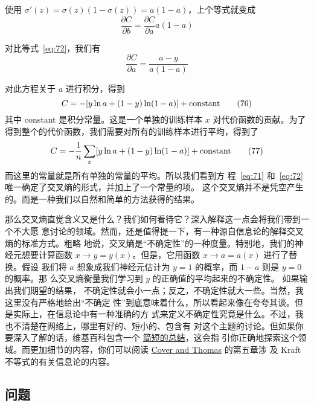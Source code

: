 使用 $\sigma'(z) = \sigma(z)(1-\sigma(z)) = a(1-a)$，上个等式就变成
\begin{equation}
  \frac{\partial C}{\partial b} = \frac{\partial C}{\partial a}
  a(1-a)
  \label{eq:74}\tag{74}
\end{equation}

对比等式~\eqref{eq:72}，我们有
\begin{equation}
  \frac{\partial C}{\partial a} = \frac{a-y}{a(1-a)}
  \label{eq:75}\tag{75}
\end{equation}

对此方程关于 $a$ 进行积分，得到
\begin{equation}
  C = -[y \ln a + (1-y) \ln (1-a)]+ {\rm constant}
  \label{eq:76}\tag{76}
\end{equation}
其中 {\rm constant} 是积分常量。这是一个单独的训练样本 $x$ 对代价函数的贡献。为了
得到整个的代价函数，我们需要对所有的训练样本进行平均，得到了
\begin{equation}
  C = -\frac{1}{n} \sum_x [y \ln a +(1-y) \ln(1-a)] + {\rm constant}
  \label{eq:77}\tag{77}
\end{equation}
而这里的常量就是所有单独的常量的平均。所以我们看到方
程~\eqref{eq:71} 和~\eqref{eq:72} 唯一确定了交叉熵的形式，并加上了一个常量的项。
这个交叉熵并不是凭空产生的。而是一种我们以自然和简单的方法获得的结果。

那么交叉熵直觉含义又是什么？我们如何看待它？深入解释这一点会将我们带到一个不大愿
意讨论的领域。然而，还是值得提一下，有一种源自信息论的解释交叉熵的标准方式。粗略
地说，交叉熵是“不确定性”的一种度量。特别地，我们的神经元想要计算函数 $x
\rightarrow y = y(x)$。但是，它用函数 $x \rightarrow a = a(x)$ 进行了替换。假设
我们将 $a$ 想象成我们神经元估计为 $y = 1$ 的概率，而 $1-a$ 则是 $y=0$ 的概率。那
么交叉熵衡量我们学习到 $y$ 的正确值的平均起来的不确定性。 如果输出我们期望的结果，
不确定性就会小一点；反之，不确定性就大一些。当然，我这里没有严格地给出“不确定
性”到底意味着什么，所以看起来像在夸夸其谈。但是实际上，在信息论中有一种准确的方
式来定义不确定性究竟是什么。不过，我也不清楚在网络上，哪里有好的、短小的、包含有
对这个主题的讨论。但如果你要深入了解的话，维基百科包含一个%
\href{http://en.wikipedia.org/wiki/Cross_entropy#Motivation}{简短的总结}，这会指
引你正确地探索这个领域。而更加细节的内容，你们可以阅读
\href{http://books.google.ca/books?id=VWq5GG6ycxMC}{Cover and Thomas} 的第五章涉
及 Kraft 不等式的有关信息论的内容。

\subsection*{问题}

